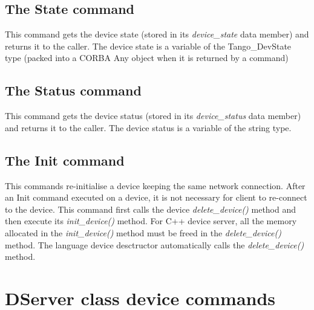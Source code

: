 \subsection{The State command}

This command gets the device state (stored in its \emph{device\_state}
data member) and returns it to the caller. The device state is a variable
of the Tango\_DevState type (packed into a CORBA Any object when it
is returned by a command)


\subsection{The Status command}

This command gets the device status (stored in its \emph{device\_status}
data member) and returns it to the caller. The device status is a
variable of the string type.


\subsection{The Init command}

This commands re-initialise a device keeping the same network connection.
After an Init command executed on a device, it is not necessary for
client to re-connect to the device. This command first calls the device
\emph{delete\_device()} method and then execute its \emph{init\_device()}
method. For C++ device server, all the memory allocated in the \emph{init\_device()}
method must be freed in the \emph{delete\_device()} method. The language
device desctructor automatically calls the \emph{delete\_device()}
method.


\section{DServer class device commands}

